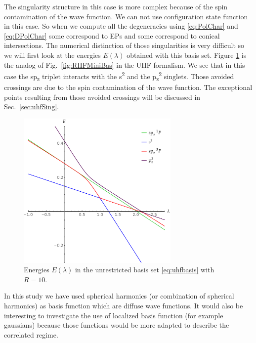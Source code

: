 \documentclass[11pt,a4paper]{article}
\begin{document}
The singularity structure in this case is more complex because of the spin contamination of the wave function. We can not use configuration state function in this case. So when we compute all the degeneracies using \eqref{eq:PolChar} and \eqref{eq:DPolChar} some correspond to EPs and some correspond to conical intersections. The numerical distinction of those singularities is very difficult so we will first look at the energies $E(\lambda)$ obtained with this basis set.
Figure \ref{fig:UHFMiniBas} is the analog of Fig.~\ref{fig:RHFMiniBas} in the UHF formalism. We see that in this case the sp\textsubscript{z} triplet interacts with the s\textsuperscript{2} and the p\textsubscript{z}\textsuperscript{2} singlets. Those avoided crossings are due to the spin contamination of the wave function. The exceptional points resulting from those avoided crossings will be discussed in Sec.~\ref{sec:uhfSing}. \\

\begin{figure}[h!]
    \centering
    \includegraphics[width=0.7\textwidth]{EMP_UHF_R10.pdf}
    \caption{\centering Energies $E(\lambda)$ in the unrestricted basis set \eqref{eq:uhfbasis} with $R=10$.}
    \label{fig:UHFMiniBas}
\end{figure}

In this study we have used spherical harmonics (or combination of spherical harmonics) as basis function which are diffuse wave functions. It would also be interesting to investigate the use of localized basis function \cite{Seidl_2018} (for example gaussians) because those functions would be more adapted to describe the correlated regime. \\
\end{document}
